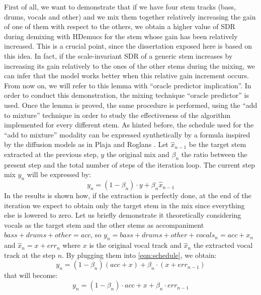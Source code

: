 \documentclass{article}
\begin{document}
\begin{sloppy}
\begin{itemize}
\end{itemize}
First of all, we want to demonstrate that if we have four stem tracks (bass, drums, vocals and other) and we mix them together relatively increasing the gain of one of them with respect to the others, we obtain a higher value of SDR during demixing with HDemucs for the stem whose gain has been relatively increased. This is a crucial point, since the dissertation exposed here is based on this idea. In fact, if the scale-invariant SDR of a generic stem increases by increasing its gain relatively to the ones of the other stems during the mixing, we can infer that the model works better when this relative gain increment occurs. From now on, we will refer to this lemma with ``oracle predictor implication''. In order to conduct this demonstration, the mixing technique ``oracle predictor'' is used. Once the lemma is proved, the same procedure 
is performed, using the ``add to mixture'' technique in order to study the effectiveness of the algorithm implemented for every different stem.
As hinted before, the schedule used for the ``add to mixture'' modality can be expressed synthetically by a formula inspired by the diffusion models as in Plaja and Roglans \cite{Plaja-Roglans_2022}. Let $\hat{x}_{n-1}$ be the target stem extracted at the previous step, $y$ the original mix and $\beta_n$ the ratio between the present step and the total number of steps of the iteration loop. %
The current step mix $y_n$ will be expressed by:
\begin{equation}
  \label{eqn:schedule}
    y_n=(1-\beta_n)\cdot y + \beta_n \hat{x}_{n-1}
\end{equation}
In the results is shown how, if the extraction is perfectly done, at the end of the iteration we expect to obtain only the target stem in the mix since everything else is lowered to zero. Let us briefly demonstrate it theoretically considering vocals as the target stem and the other stems as accompaniment $bass+drums+other=acc$, so $y_n=bass+drums+other+vocals_n=acc+x_n$ and $\hat{x}_n=x+err_n$ where $x$ is the original vocal track and $\hat{x}_n$ the extracted vocal track at the step $n$. By plugging them into \ref{eqn:schedule}, we obtain:
\begin{equation}
  \label{eqn:schedule1}
    y_n=(1-\beta_n)(acc+x) + \beta_n \cdot(x+err_{n-1})
\end{equation}
that will become:
\begin{equation}
  \label{eqn:schedule2}
    y_n=(1-\beta_n)\cdot acc + x + \beta_n \cdot err_{n-1}
\end{equation}


\end{sloppy}
\end{document}

